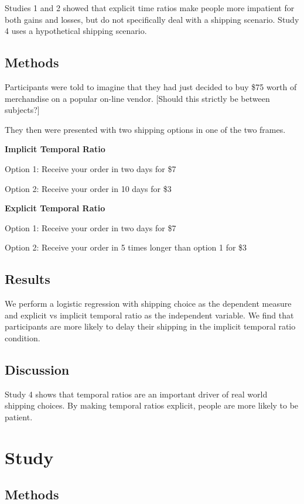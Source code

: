 \documentclass[]{article}
\begin{document}
Studies 1 and 2 showed that explicit time ratios make people more impatient for both gains and losses, but do not specifically deal with a shipping scenario. Study 4 uses a hypothetical shipping scenario.

\subsection{Methods}

Participants were told to imagine that they had just decided to buy \$75 worth of merchandise on a popular on-line vendor. 
[Should this strictly be between subjects?]

They then were presented with two shipping options in one of the two frames.

\textbf{Implicit Temporal Ratio}

Option 1: Receive your order in two days for \$7

Option 2: Receive your order in 10 days for \$3
 
 
\textbf{Explicit Temporal Ratio}

Option 1: Receive your order in two days for \$7

Option 2: Receive your order in 5 times longer than option 1 for \$3

\subsection{Results}

We perform a logistic regression with shipping choice as the dependent measure and explicit vs implicit temporal ratio as the independent variable. 
We find that participants are more likely to delay their shipping in the implicit temporal ratio condition. 

\subsection{Discussion}

Study 4 shows that temporal ratios are an important driver of real world shipping choices. 
By making temporal ratios explicit, people are more likely to be patient. 

\section{Study}

\subsection{Methods}
\end{document}

